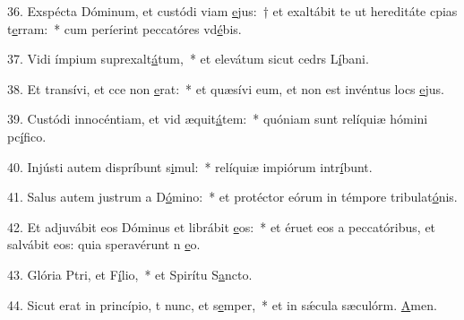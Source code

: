 36. Exspécta Dóminum, et custódi viam \uline{e}jus:~† et exaltábit te ut hereditáte cpias t\uline{e}rram:~* cum períerint peccatóres vd\uline{é}bis.\par 
37. Vidi ímpium suprexalt\uline{á}tum,~* et elevátum sicut cedrs L\uline{í}bani.\par 
38. Et transívi, et cce non \uline{e}rat:~* et quæsívi eum, et non est invéntus locs \uline{e}jus.\par 
39. Custódi innocéntiam, et vid æquit\uline{á}tem:~* quóniam sunt relíquiæ hómini pc\uline{í}fico.\par 
40. Injústi autem dispríbunt s\uline{i}mul:~* relíquiæ impiórum intr\uline{í}bunt.\par 
41. Salus autem justrum a D\uline{ó}mino:~* et protéctor eórum in témpore tribulat\uline{ó}nis.\par 
42. Et adjuvábit eos Dóminus et librábit \uline{e}os:~* et éruet eos a peccatóribus, et salvábit eos: quia speravérunt n \uline{e}o.\par 
43. Glória Ptri, et F\uline{í}lio,~* et Spirítu S\uline{a}ncto.\par 
44. Sicut erat in princípio, t nunc, et s\uline{e}mper,~* et in sǽcula sæculórm. \uline{A}men.\par 
